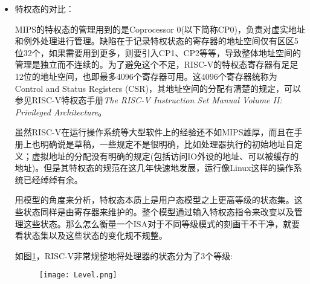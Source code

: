 \begin{itemize}
	
	\item 特权态的对比：
	
	MIPS的特权态的管理用到的是Coprocessor 0(以下简称CP0)，负责对虚实地址和例外处理进行管理。缺陷在于记录特权状态的寄存器的地址空间仅有区区5位32个，如果需要用到更多，则要引入CP1、CP2等等，导致整体地址空间的管理是独立而不连续的。为了避免这个不足，RISC-V的特权态寄存器有足足12位的地址空间，也即最多4096个寄存器可用。这4096个寄存器统称为Control and Status Registers (CSR)，其地址空间的分配有清楚的规定，可以参见RISC-V特权态手册\textit{The RISC-V Instruction Set Manual Volume II: Privileged Architecture}\citep{privileged2017}。
	
	虽然RISC-V在运行操作系统等大型软件上的经验还不如MIPS雄厚，而且在手册上也明确说是草稿，一些规定不是很明确，比如处理器执行的初始地址自定义；虚拟地址的分配没有明确的规定(包括访问IO外设的地址、可以被缓存的地址)。但是其特权态的规范在这几年快速地发展，运行像Linux这样的操作系统已经绰绰有余。
	
	用模型的角度来分析，特权态本质上是用户态模型之上更高等级的状态集。这些状态同样是由寄存器来维护的。整个模型通过输入特权态指令来改变以及管理这些状态。那么怎么衡量一个ISA对于不同等级模式的刻画干不干净，就要看状态集以及这些状态的变化规不规整。
	
	如图\ref{fig:mode}，RISC-V非常规整地将处理器的状态分为了3个等级:
	\begin{figure}[!htbp]
		\centering
		\texttt{[image: Level.png]}
		\label{fig:mode}
	\end{figure}
	

\end{itemize}
